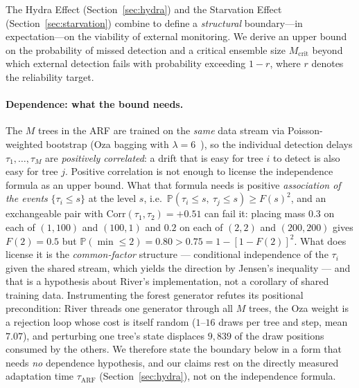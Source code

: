 \documentclass[10pt,conference]{IEEEtran}
\theoremstyle{definition}
\begin{document}
The Hydra Effect (Section~\ref{sec:hydra}) and the Starvation Effect (Section~\ref{sec:starvation}) combine to define a \emph{structural} boundary---in expectation---on the viability of external monitoring.
We derive an upper bound on the probability of missed detection and a critical ensemble size $M_{\mathrm{crit}}$ beyond which external detection fails with probability exceeding $1 - r$, where $r$ denotes the reliability target.

\paragraph{Dependence: what the bound needs.}
The $M$ trees in the ARF are trained on the \emph{same} data stream via Poisson-weighted bootstrap (Oza bagging with $\lambda = 6$~\cite{gomes_arf_2017}), so the individual detection delays $\tau_1, \ldots, \tau_M$ are \emph{positively correlated}: a drift that is easy for tree $i$ to detect is also easy for tree $j$.
Positive correlation is not enough to license the independence formula as an upper bound. What that formula needs is positive \emph{association of the events} $\{\tau_i \le s\}$ at the level $s$, i.e.\ $\mathbb{P}(\tau_i \le s,\ \tau_j \le s) \ge F(s)^2$, and an exchangeable pair with $\mathrm{Corr}(\tau_1,\tau_2) = +0.51$ can fail it: placing mass $0.3$ on each of $(1,100)$ and $(100,1)$ and $0.2$ on each of $(2,2)$ and $(200,200)$ gives $F(2) = 0.5$ but $\mathbb{P}(\min \le 2) = 0.80 > 0.75 = 1 - [1-F(2)]^2$.
What does license it is the \emph{common-factor} structure --- conditional independence of the $\tau_i$ given the shared stream, which yields the direction by Jensen's inequality --- and that is a hypothesis about River's implementation, not a corollary of shared training data. Instrumenting the forest generator refutes its positional precondition: River threads one generator through all $M$ trees, the Oza weight is a rejection loop whose cost is itself random ($1$--$16$ draws per tree and step, mean $7.07$), and perturbing one tree's state displaces $9{,}839$ of the draw positions consumed by the others.
We therefore state the boundary below in a form that needs \emph{no} dependence hypothesis, and our claims rest on the directly measured adaptation time $\tau_{\mathrm{ARF}}$ (Section~\ref{sec:hydra}), not on the independence formula.
\end{document}
